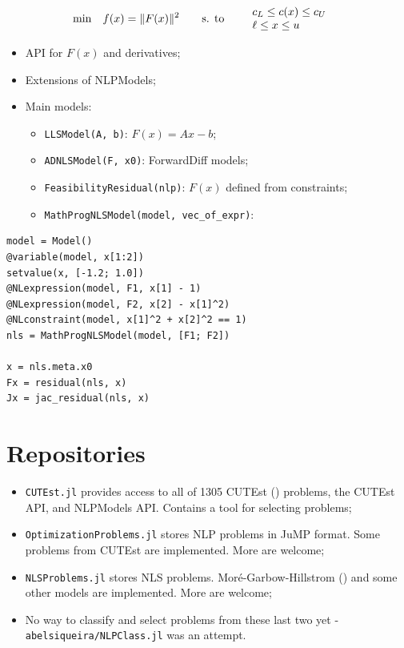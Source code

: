 \begin{frame}[fragile,t]
  \begin{align*}
    \min & \quad f(x) = \Vert F(x) \Vert^2 \qquad
    \mbox{s. to} \qquad
    \begin{array}{l}
      c_L \leq c(x) \leq c_U \\
      \ell \leq x \leq u
    \end{array}
  \end{align*}
  \begin{itemize}
    \item API for $F(x)$ and derivatives;
    \item Extensions of NLPModels;
    \item Main models:
    \begin{itemize}
      \item \verb+LLSModel(A, b)+:
        $F(x) = Ax - b$;
      \item \verb+ADNLSModel(F, x0)+:
        ForwardDiff models;
      \item \verb+FeasibilityResidual(nlp)+:
        $F(x)$ defined from constraints;
      \item \verb+MathProgNLSModel(model, vec_of_expr)+:
    \end{itemize}
  \end{itemize}
\end{frame}

\begin{frame}[fragile,t]
\begin{lstlisting}
model = Model()
@variable(model, x[1:2])
setvalue(x, [-1.2; 1.0])
@NLexpression(model, F1, x[1] - 1)
@NLexpression(model, F2, x[2] - x[1]^2)
@NLconstraint(model, x[1]^2 + x[2]^2 == 1)
nls = MathProgNLSModel(model, [F1; F2])

x = nls.meta.x0
Fx = residual(nls, x)
Jx = jac_residual(nls, x)
\end{lstlisting}
\end{frame}

\section{Repositories}

\begin{frame}[fragile,t]
  \begin{itemize}
    \item \verb+CUTEst.jl+ provides access to all of 1305 CUTEst (\cite{cutest})
      problems, the CUTEst API,
      and NLPModels API. Contains a tool for selecting problems;
    \item \verb+OptimizationProblems.jl+ stores NLP problems in JuMP format. Some
      problems from CUTEst are implemented. More are welcome;
    \item \verb+NLSProblems.jl+ stores NLS problems. Moré-Garbow-Hillstrom (\cite{mgh})
      and some other models are implemented. More are welcome;
    \item No way to classify and select problems from these last two yet -
      \verb+abelsiqueira/NLPClass.jl+ was an attempt.
  \end{itemize}
\end{frame}

